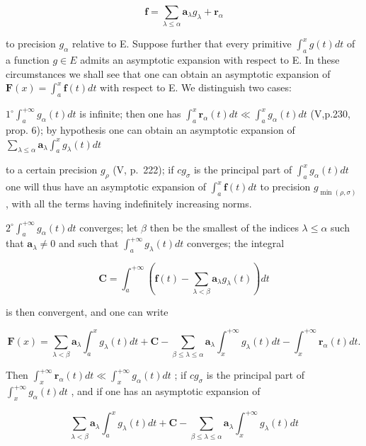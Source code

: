 \[
\mathbf {f} = \sum_ {\lambda \leqslant \alpha} \mathbf {a} _ {\lambda} g _ {\lambda} + \mathbf {r} _ {\alpha}
\]

to precision \(g_{\alpha}\) relative to E. Suppose further that every primitive \(\int_{a}^{x} g(t) dt\) of a function \(g \in E\) admits an asymptotic expansion with respect to E. In these circumstances we shall see that one can obtain an asymptotic expansion of \(\mathbf{F}(x) = \int_{a}^{x} \mathbf{f}(t) dt\) with respect to E. We distinguish two cases:

\(1^{\circ}\int_{a}^{+\infty}g_{\alpha}(t)dt\) is infinite; then one has \(\int_{a}^{x}\mathbf{r}_{\alpha}(t)dt\ll \int_{a}^{x}g_{\alpha}(t)dt\) (V,p.230, prop. 6); by hypothesis one can obtain an asymptotic expansion of \(\sum_{\lambda \leqslant \alpha}\mathbf{a}_{\lambda}\int_{a}^{x}g_{\lambda}(t)dt\)

to a certain precision \(g_{\rho}\) (V, p.~222); if \(cg_{\sigma}\) is the principal part of \(\int_{a}^{x} g_{\alpha}(t) dt\) one will thus have an asymptotic expansion of \(\int_{a}^{x} \mathbf{f}(t) dt\) to precision \(g_{\min(\rho, \sigma)}\) , with all the terms having indefinitely increasing norms.

\(2^{\circ}\int_{a}^{+\infty}g_{\alpha}(t)dt\) converges; let \(\beta\) then be the smallest of the indices \(\lambda \leqslant \alpha\) such that \(\mathbf{a}_{\lambda}\neq 0\) and such that \(\int_{a}^{+\infty}g_{\lambda}(t)dt\) converges; the integral

\[
\mathbf {C} = \int_ {a} ^ {+ \infty} \left(\mathbf {f} (t) - \sum_ {\lambda <   \beta} \mathbf {a} _ {\lambda} g _ {\lambda} (t)\right) d t
\]

is then convergent, and one can write

\[
\mathbf {F} (x) = \sum_ {\lambda <   \beta} \mathbf {a} _ {\lambda} \int_ {a} ^ {x} g _ {\lambda} (t) d t + \mathbf {C} - \sum_ {\beta \leqslant \lambda \leqslant \alpha} \mathbf {a} _ {\lambda} \int_ {x} ^ {+ \infty} g _ {\lambda} (t) d t - \int_ {x} ^ {+ \infty} \mathbf {r} _ {\alpha} (t) d t.
\]

Then \(\int_{x}^{+\infty}\mathbf{r}_{\alpha}(t)dt\ll \int_{x}^{+\infty}g_{\alpha}(t)dt\) ; if \(cg_{\sigma}\) is the principal part of \(\int_{x}^{+\infty}g_{\alpha}(t)dt\) , and if one has an asymptotic expansion of

\[
\sum_ {\lambda <   \beta} \mathbf {a} _ {\lambda} \int_ {a} ^ {x} g _ {\lambda} (t) d t + \mathbf {C} - \sum_ {\beta \leqslant \lambda \leqslant \alpha} \mathbf {a} _ {\lambda} \int_ {x} ^ {+ \infty} g _ {\lambda} (t) d t
\]

